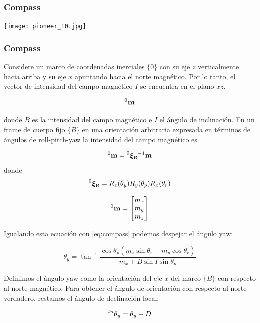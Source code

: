 \begin{frame}
    \frametitle{Compass}

    \begin{center}
        \texttt{[image: pioneer\_10.jpg]}
    \end{center}
\end{frame}


\begin{frame}
    \frametitle{Compass}
    \scriptsize
    Considere un marco de coordenadas inerciales $\{ 0 \}$ con su eje $z$ verticalmente hacia arriba y su eje $x$ apuntando hacia el norte magnético. Por lo tanto, el vector de intensidad del campo magnético $I$ se encuentra en el plano $xz$.

    \begin{equation*}
        \toCoord{\vec{m}}{0}
    \end{equation*}

    donde $B$ es la intensidad del campo magnético e $I$ el ángulo de inclinación. En un frame de cuerpo fijo $\{ B \}$ en una orientación arbitraria expresada en términos de ángulos de roll-pitch-yaw la intensidad del campo magnético es

    \begin{equation}
        \label{eq:compass}
        \toCoord{\vec{m}}{0} = \transform{0}{B}^{-1} \vec{m}
    \end{equation}
    donde
    \begin{equation*}
        \transform{0}{B} = R_{z}(\theta_{y}) R_{y}(\theta_{p}) R_{x}(\theta_{r})
    \end{equation*}

    \begin{equation*}
    \toCoord{\vec{m}}{0} =
    \begin{bmatrix}
        m_{x} \\
        m_{y} \\
        m_{z}
    \end{bmatrix}
    \end{equation*}

    Igualando esta ecuación con \ref{eq:compass} podemos despejar el ángulo yaw:

    \begin{equation*}
        \theta_{y} = \tan^{-1} \dfrac{\cos \theta_{p}  \left( m_{z} \sin \theta_{r} - m_{y} \cos \theta_{r} \right)} {m_{x} + B \sin I \sin \theta_{p}}
    \end{equation*}

    Definimos el ángulo yaw como la orientación del eje $x$ del marco $\{ B \}$ con respecto al norte magnético. Para obtener el ángulo de orientación con respecto al norte verdadero, restamos el ángulo de declinación local:

    \begin{equation*}
        \prescript{tn}{}{\theta_{y}} = \theta_{y} - D
    \end{equation*}

\end{frame}
